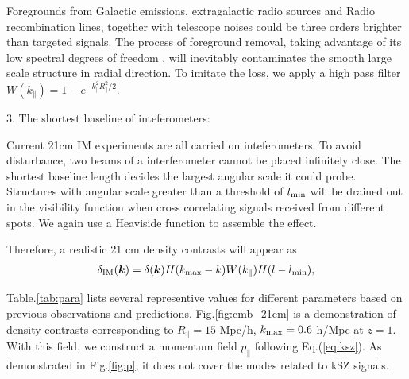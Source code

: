 Foregrounds from Galactic emissions, 
extragalactic radio sources and Radio recombination lines, 
together with telescope noises 
could be three orders brighter than targeted signals\cite{DiMatteo04,Masui13}. 
The process of foreground removal, taking advantage of its low spectral
degrees of freedom \cite{Switzer15}, 
will inevitably contaminates the smooth large scale structure in radial direction.  
To imitate the loss, we apply a high pass filter $W(k_\parallel)=1-e^{-k_\parallel^2R_\parallel^2/2}$. 

3. The shortest baseline of inteferometers:

Current 21cm IM experiments are all carried on inteferometers. 
To avoid disturbance, two beams of a interferometer 
cannot be placed infinitely close. 
The shortest baseline length decides the largest 
angular scale it could probe.  
Structures with angular scale greater than a threshold of 
$l_\mathrm{min}$ will be drained out 
in the visibility function 
when cross correlating signals received from different spots. 
We again use a Heaviside function to assemble the effect. 

Therefore, a realistic 21 cm density contrasts will appear as 
\begin{eqnarray}
\label{eq:ns}
    \delta_\mathrm{IM}(\bm{k})=\delta(\bm{k})H(k_\mathrm{max}-k)W(k_\parallel)H(l-l_\mathrm{min}),
\end{eqnarray}

Table.\ref{tab:para} 
lists several representive values for different parameters 
based on previous observations and predictions. 
Fig.\ref{fig:cmb_21cm} 
is a demonstration of density contrasts corresponding to 
$R_\parallel=15$ Mpc/h, $k_\mathrm{max}=0.6$ h/Mpc 
at $z=1$. 
With this field, 
we construct a momentum field $p_\parallel$ following Eq.(\ref{eq:ksz}). 
As demonstrated in Fig.\ref{fig:p}, 
it does not cover the modes related to kSZ signals. 

